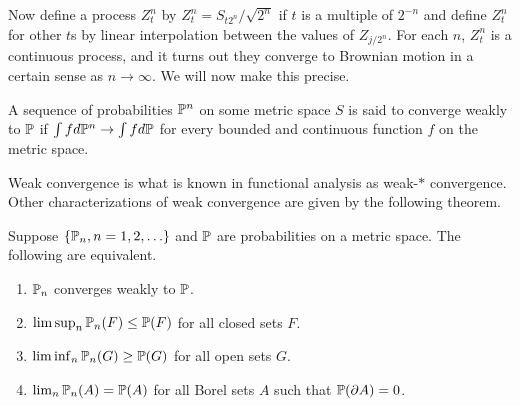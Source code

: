 Now define a process $Z_t^n$ by $Z_t^n = S_{t2^n}/\sqrt{2^n}$ if $t$ is a multiple of $2^{-n}$ and define $Z_t^n$ for other $t$s by linear interpolation between the values of $Z_{j/2^n}$. For each $n$, $Z_t^n$ is a continuous process, and it turns out they converge to Brownian motion in a certain sense as $n \to \infty$. We will now make this precise.

\begin{definition}\label{def:weak_convergence}
A sequence of probabilities $\P^n$ on some metric space $S$ is said to converge weakly to $\P$ if $\int f d\P^n \to \int f d\P$ for every bounded and continuous function $f$ on the metric space.
\end{definition}

Weak convergence is what is known in functional analysis as weak-$*$ convergence. Other characterizations of weak convergence are given by the following theorem.

\begin{theorem}\label{thm:ch1_7.2}
Suppose $\{\P_n, n = 1,2,\ldots\}$ and $\P$ are probabilities on a metric space. The following are equivalent.
\begin{enumerate}
    \item $\P_n$ converges weakly to $\P$.
    \item $\limsup_n \P_n(F) \leq \P(F)$ for all closed sets $F$.
    \item $\liminf_n \P_n(G) \geq \P(G)$ for all open sets $G$.
    \item $\lim_n \P_n(A) = \P(A)$ for all Borel sets $A$ such that $\P(\partial A) = 0$.
\end{enumerate}
\end{theorem}


